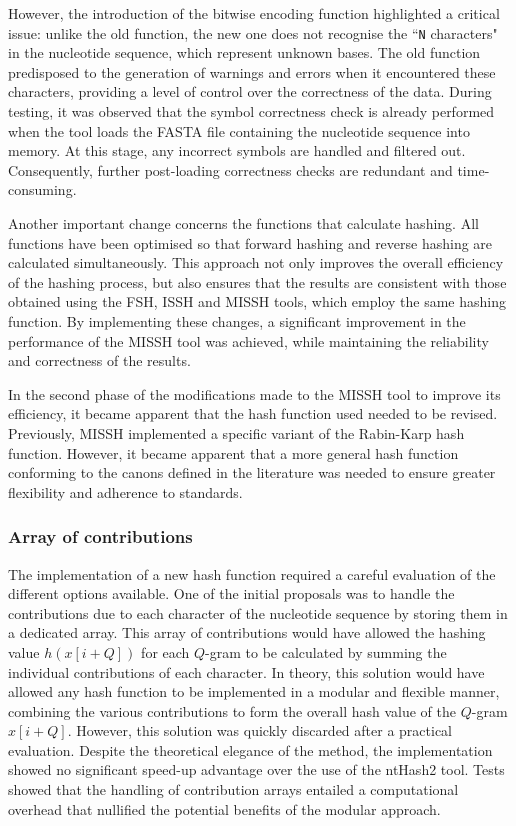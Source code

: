 However, the introduction of the bitwise encoding function highlighted a critical issue: unlike the old function, the new one does not recognise the “\texttt{N} characters" in the nucleotide sequence, which represent unknown bases. The old function predisposed to the generation of warnings and errors when it encountered these characters, providing a level of control over the correctness of the data. During testing, it was observed that the symbol correctness check is already performed when the tool loads the FASTA file containing the nucleotide sequence into memory. At this stage, any incorrect symbols are handled and filtered out. Consequently, further post-loading correctness checks are redundant and time-consuming.

Another important change concerns the functions that calculate hashing. All functions have been optimised so that forward hashing and reverse hashing are calculated simultaneously. This approach not only improves the overall efficiency of the hashing process, but also ensures that the results are consistent with those obtained using the \acs{FSH}, \acs{ISSH} and \acs{MISSH} tools, which employ the same hashing function. By implementing these changes, a significant improvement in the performance of the \acs{MISSH} tool was achieved, while maintaining the reliability and correctness of the results.




In the second phase of the modifications made to the \acs{MISSH} tool to improve its efficiency, it became apparent that the hash function used needed to be revised. Previously, \acs{MISSH} implemented a specific variant of the Rabin-Karp hash function. However, it became apparent that a more general hash function conforming to the canons defined in the literature was needed to ensure greater flexibility and adherence to standards.

\subsubsection*{Array of contributions}
The implementation of a new hash function required a careful evaluation of the different options available. One of the initial proposals was to handle the contributions due to each character of the nucleotide sequence by storing them in a dedicated array. This array of contributions would have allowed the hashing value $h(x[i + Q])$ for each $Q$-gram to be calculated by summing the individual contributions of each character. In theory, this solution would have allowed any hash function to be implemented in a modular and flexible manner, combining the various contributions to form the overall hash value of the $Q$-gram $x[i + Q]$. However, this solution was quickly discarded after a practical evaluation. Despite the theoretical elegance of the method, the implementation showed no significant speed-up advantage over the use of the ntHash2 tool. Tests showed that the handling of contribution arrays entailed a computational overhead that nullified the potential benefits of the modular approach.


